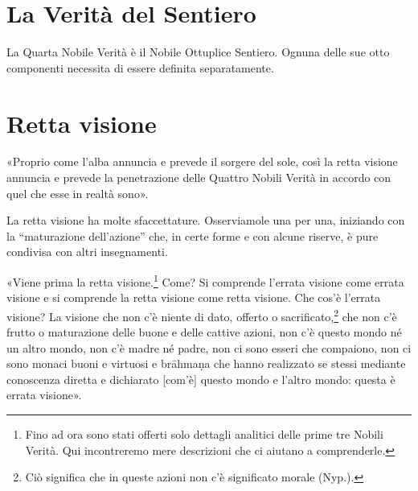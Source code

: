 
\section*{La Verità del Sentiero}

 La Quarta Nobile Verità è il Nobile Ottuplice
Sentiero. Ognuna delle sue otto componenti necessita di essere definita
separatamente.

\section*{Retta visione}

 «Proprio come l’alba annuncia e prevede il sorgere del sole,
così la retta visione annuncia e prevede la penetrazione delle Quattro Nobili
Verità in accordo con quel che esse in realtà sono».


 La retta visione ha molte sfaccettature.
Osserviamole una per una, iniziando con la “maturazione dell’azione” che, in
certe forme e con alcune riserve, è pure condivisa con altri insegnamenti.

 «Viene prima la retta visione.\footnote{Fino ad ora sono
  stati offerti solo dettagli analitici delle prime tre Nobili Verità. Qui
  incontreremo mere descrizioni che ci aiutano a comprenderle.} Come? Si
comprende l’errata visione come errata visione e si comprende la retta visione
come retta visione. Che cos’è l’errata visione? La visione che non c’è niente di
dato, offerto o sacrificato,\footnote{Ciò significa che in queste azioni non c’è
  significato morale (Nyp.).} che non c’è frutto o maturazione delle buone e
delle cattive azioni, non c’è questo mondo né un altro mondo, non c’è madre né
padre, non ci sono esseri che compaiono, non ci sono monaci buoni e virtuosi e
brāhmaṇa che hanno realizzato se stessi mediante conoscenza diretta e dichiarato
[com’è] questo mondo e l’altro mondo: questa è errata visione».

